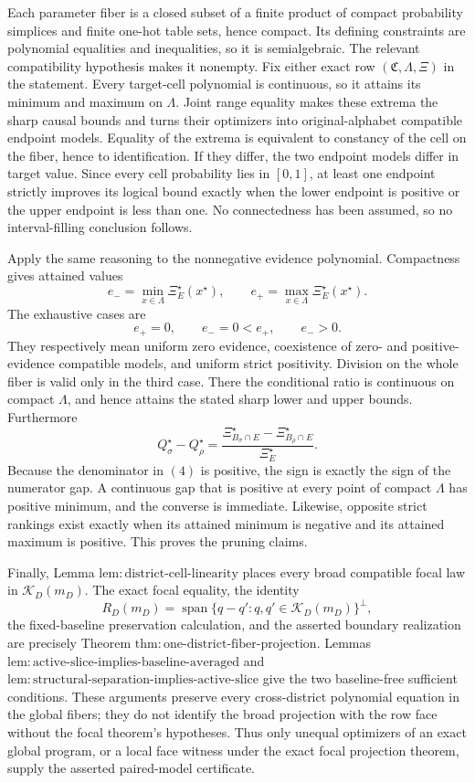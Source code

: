 Each parameter fiber is a closed subset of a finite product of compact probability simplices and finite one-hot table sets, hence compact.  Its defining constraints are polynomial equalities and inequalities, so it is semialgebraic.  The relevant compatibility hypothesis makes it nonempty.  Fix either exact row \((\mathfrak C,\Lambda,\Xi)\) in the statement.  Every target-cell polynomial is continuous, so it attains its minimum and maximum on \(\Lambda\).  Joint range equality makes these extrema the sharp causal bounds and turns their optimizers into original-alphabet compatible endpoint models.  Equality of the extrema is equivalent to constancy of the cell on the fiber, hence to identification.  If they differ, the two endpoint models differ in target value.  Since every cell probability lies in \([0,1]\), at least one endpoint strictly improves its logical bound exactly when the lower endpoint is positive or the upper endpoint is less than one.  No connectedness has been assumed, so no interval-filling conclusion follows.

Apply the same reasoning to the nonnegative evidence polynomial.  Compactness gives attained values
\[
e_-=\min_{x\in\Lambda}\Xi_E^\star(x^\star),
\qquad
e_+=\max_{x\in\Lambda}\Xi_E^\star(x^\star).
\]
The exhaustive cases are
\[
e_+=0,\qquad e_-=0<e_+,\qquad e_->0.
\tag{3}
\]
They respectively mean uniform zero evidence, coexistence of zero- and positive-evidence compatible models, and uniform strict positivity.  Division on the whole fiber is valid only in the third case.  There the conditional ratio is continuous on compact \(\Lambda\), and hence attains the stated sharp lower and upper bounds.  Furthermore
\[
Q_\sigma^\star-Q_\rho^\star
=\frac{\Xi_{B_\sigma\cap E}^\star-
\Xi_{B_\rho\cap E}^\star}{\Xi_E^\star}.
\tag{4}
\]
Because the denominator in \((4)\) is positive, the sign is exactly the sign of the numerator gap.  A continuous gap that is positive at every point of compact \(\Lambda\) has positive minimum, and the converse is immediate.  Likewise, opposite strict rankings exist exactly when its attained minimum is negative and its attained maximum is positive.  This proves the pruning claims.

Finally, Lemma \(\mathrm{lem:district\text{-}cell\text{-}linearity}\) places every broad compatible focal law in \(\mathcal K_D(m_D)\).  The exact focal equality, the identity
\[
R_D(m_D)=\operatorname{span}\{q-q':q,q'\in\mathcal K_D(m_D)\}^{\perp},
\]
the fixed-baseline preservation calculation, and the asserted boundary realization are precisely Theorem \(\mathrm{thm:one\text{-}district\text{-}fiber\text{-}projection}\).  Lemmas \(\mathrm{lem:active\text{-}slice\text{-}implies\text{-}baseline\text{-}averaged}\) and \(\mathrm{lem:structural\text{-}separation\text{-}implies\text{-}active\text{-}slice}\) give the two baseline-free sufficient conditions.  These arguments preserve every cross-district polynomial equation in the global fibers; they do not identify the broad projection with the row face without the focal theorem's hypotheses.  Thus only unequal optimizers of an exact global program, or a local face witness under the exact focal projection theorem, supply the asserted paired-model certificate.